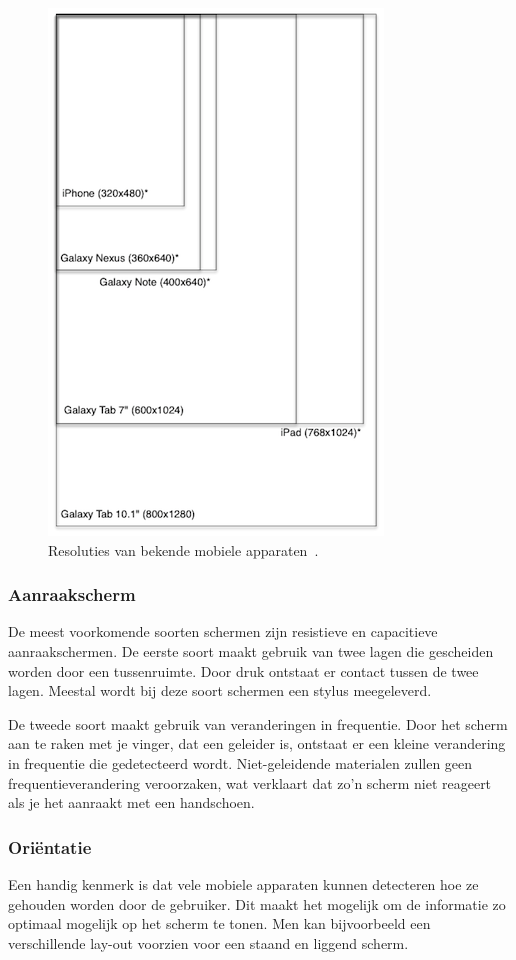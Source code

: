 \begin{figure}
  \centering
  \includegraphics[height=0.8\textwidth]{figuren/mobile-devices-resolutions.png}
  \caption{Resoluties van bekende mobiele apparaten~\cite{Wolfermann2012}.}
  \label{fig:resoluties}
\end{figure}

\subsubsection{Aanraakscherm}
De meest voorkomende soorten schermen zijn resistieve en capacitieve aanraakschermen. De eerste soort maakt gebruik van twee lagen die gescheiden worden door een tussenruimte. Door druk ontstaat er contact tussen de twee lagen. Meestal wordt bij deze soort schermen een stylus meegeleverd. 

De tweede soort maakt gebruik van veranderingen in frequentie. Door het scherm aan te raken met je vinger, dat een geleider is, ontstaat er een kleine verandering in frequentie die gedetecteerd wordt. Niet-geleidende materialen zullen geen frequentieverandering veroorzaken, wat verklaart dat zo'n scherm niet reageert als je het aanraakt met een handschoen.

\subsubsection{Oriëntatie}
Een handig kenmerk is dat vele mobiele apparaten kunnen detecteren hoe ze gehouden worden door de gebruiker. Dit maakt het mogelijk om de informatie zo optimaal mogelijk op het scherm te tonen. Men kan bijvoorbeeld een verschillende lay-out voorzien voor een staand en liggend scherm.

